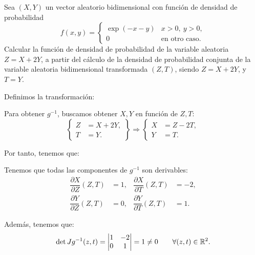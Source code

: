 \begin{ejercicio}
    Sea $(X,Y)$ un vector aleatorio bidimensional con función de densidad de probabilidad
    \begin{equation*}
        f(x, y) = \begin{cases}
            \exp(-x-y) & x>0,~y>0, \\
            0 & \text{en otro caso}.
        \end{cases}
    \end{equation*}
    Calcular la función de densidad de probabilidad de la variable aleatoria $Z=X+2Y$, a partir del cálculo de la densidad de probabilidad conjunta de la variable aleatoria bidimensional transformada $(Z,T)$, siendo $Z=X+2Y$, y $T=Y$.

    Definimos la transformación:

    Para obtener $g^{-1}$, buscamos obtener $X,Y$ en función de $Z,T$:
    \begin{equation*}
        \left\{\begin{aligned}
            Z&=X+2Y, \\
            T&=Y.
        \end{aligned}\right\}\Longrightarrow
        \left\{\begin{aligned}
            X&=Z-2T, \\
            Y&=T.
        \end{aligned}\right.
    \end{equation*}

    Por tanto, tenemos que:

    Tenemos que todas las componentes de $g^{-1}$ son derivables:
    \begin{align*}
        \dfrac{\partial X}{\partial Z}(Z,T)&=1, & \dfrac{\partial X}{\partial T}(Z,T)&=-2,\\
        \dfrac{\partial Y}{\partial Z}(Z,T)&=0, & \dfrac{\partial Y}{\partial T}(Z,T)&=1.
    \end{align*}

    Además, tenemos que:
    \begin{equation*}
        \det Jg^{-1}(z,t)=\begin{vmatrix}
            1 & -2 \\
            0 & 1
        \end{vmatrix}=1\neq 0 \qquad \forall (z,t)\in\mathbb{R}^2.
    \end{equation*}


\end{ejercicio}
